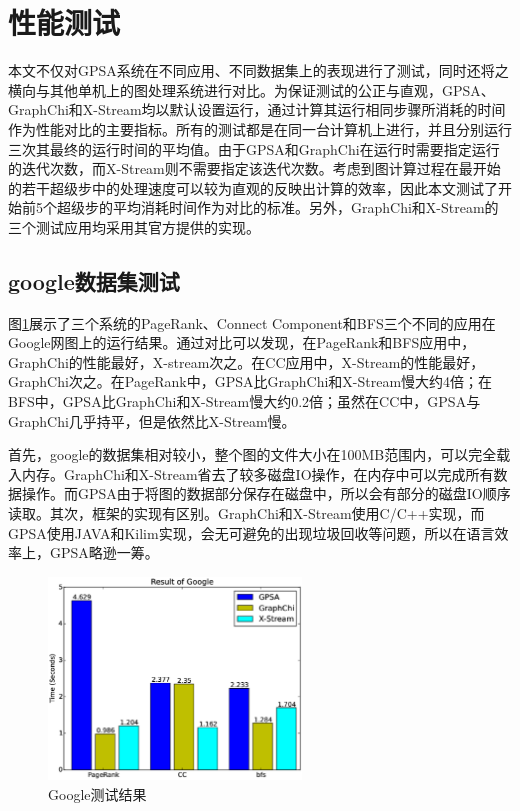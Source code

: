 \section{性能测试}
本文不仅对GPSA系统在不同应用、不同数据集上的表现进行了测试，同时还将之横向与其他单机上的图处理系统进行对比。为保证测试的公正与直观，GPSA、GraphChi和X-Stream均以默认设置运行，通过计算其运行相同步骤所消耗的时间作为性能对比的主要指标。所有的测试都是在同一台计算机上进行，并且分别运行三次其最终的运行时间的平均值。由于GPSA和GraphChi在运行时需要指定运行的迭代次数，而X-Stream则不需要指定该迭代次数。考虑到图计算过程在最开始的若干超级步中的处理速度可以较为直观的反映出计算的效率，因此本文测试了开始前5个超级步的平均消耗时间作为对比的标准。另外，GraphChi和X-Stream的三个测试应用均采用其官方提供的实现。

\subsection{google数据集测试}
图\ref{res:google}展示了三个系统的PageRank、Connect Component和BFS三个不同的应用在Google网图上的运行结果。通过对比可以发现，在PageRank和BFS应用中，GraphChi的性能最好，X-stream次之。在CC应用中，X-Stream的性能最好，GraphChi次之。在PageRank中，GPSA比GraphChi和X-Stream慢大约4倍；在BFS中，GPSA比GraphChi和X-Stream慢大约0.2倍；虽然在CC中，GPSA与GraphChi几乎持平，但是依然比X-Stream慢。

首先，google的数据集相对较小，整个图的文件大小在100MB范围内，可以完全载入内存。GraphChi和X-Stream省去了较多磁盘IO操作，在内存中可以完成所有数据操作。而GPSA由于将图的数据部分保存在磁盘中，所以会有部分的磁盘IO顺序读取。其次，框架的实现有区别。GraphChi和X-Stream使用C/C++实现，而GPSA使用JAVA和Kilim实现，会无可避免的出现垃圾回收等问题，所以在语言效率上，GPSA略逊一筹。

\begin{figure}[htbp]
\centering
\includegraphics[width=0.6\textwidth,scale=0.8]{myfigures/googletime2.eps}
\caption{Google测试结果}
\label{res:google}
\end{figure}

